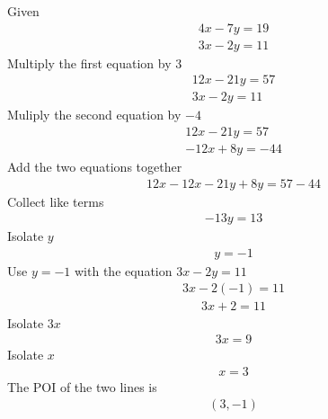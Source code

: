 \begin{questions}


\newpage

\begin{solution}
Given
\begin{gather*}
4x-7y=19\\
3x-2y=11
\end{gather*}
Multiply the first equation by 3
\begin{gather*}
12x-21y=57\\
3x-2y=11
\end{gather*}
Muliply the second equation by $-4$
\begin{gather*}
12x-21y=57\\
-12x+8y=-44
\end{gather*}
Add the two equations together
\begin{gather*}
12x-12x-21y+8y=57-44
\end{gather*}
Collect like terms
\begin{gather*}
-13y=13
\end{gather*}
Isolate $y$
\begin{gather*}
y=-1
\end{gather*}
Use $y=-1$ with the equation $3x-2y=11$
\begin{gather*}
3x-2(-1)=11
\end{gather*}
\begin{gather*}
3x+2=11
\end{gather*}
Isolate $3x$
\begin{gather*}
3x=9
\end{gather*}
Isolate $x$
\begin{gather*}
x=3
\end{gather*}
The POI of the two lines is
\begin{gather*}
(3,-1)
\end{gather*}
\end{solution}

\newpage



\end{questions}
